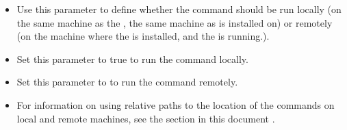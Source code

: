 
\begin{itemize}
\item Use this parameter to define whether the command should be run locally (on the same machine as the \ite{}, the same machine as \app{} is installed on) or remotely (on the machine where the \gdagent{} is installed, and the \gdaut{} is running.). 
\item Set this parameter to true to run the command locally.
\item Set this parameter to \gdrefbooleanfalse to run the command remotely. 
\item  For information on using relative paths to the location of the commands on local and remote machines, see the section in this document .
\end{itemize}
